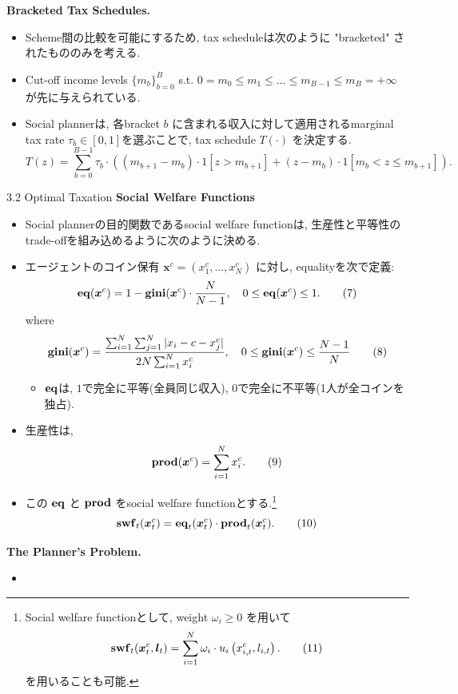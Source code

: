 \documentclass[unicode,aspectratio=169,11pt]{beamer}
\begin{document}
\begin{frame}{}{}
{\bf Bracketed Tax Schedules.}
\begin{itemize}
    \item Scheme間の比較を可能にするため, tax scheduleは次のように "bracketed" されたもののみを考える.
    \item Cut-off income levels $\{m_b\}_{b = 0}^B$ s.t. $0 = m_0 \le m_1 \le \dots \le m_{B-1}\le m_B = +\infty$ が先に与えられている.
    \item Social plannerは, 各bracket $b$ に含まれる収入に対して適用されるmarginal tax rate $\tau_b \in [0,1]$を選ぶことで, tax schedule $T(\cdot)$ を決定する.
    \[ T(z) = \sum_{b = 0}^{B-1} \tau_b \cdot \left((m_{b+1}-m_{b}) \cdot 1[z > m_{b+1}] + (z - m_b)\cdot 1[m_b < z \le m_{b+1}]\right).\]
\end{itemize}
\end{frame}

\begin{frame}{3.2 Optimal Taxation}{}
{\bf Social Welfare Functions}
\begin{itemize}
    \item Social plannerの目的関数であるsocial welfare functionは, 生産性と平等性のtrade-offを組み込めるように次のように決める.
    \item エージェントのコイン保有 $\bm{x}^c = (x_1^c, \dots, x_N^c)$ に対し, equalityを次で定義:
    \[ {\bf{eq}}(\bm{x}^c) = 1 - {\bf{gini}}(\bm{x}^c)\cdot \frac{N}{N-1},\ \ \ 0 \le {\bf eq}(\bm{x}^c)\le 1.\tag{7} \]
    where
    \[ {\bf{gini}}(\bm{x}^c) = \frac{\sum_{i=1}^N\sum_{j=1}^N |x_{i}-c - x_{j}^c|}{2N \sum_{i=1}^N x_{i}^c},
    \ \ \ 0 \le {\bf gini}(\bm{x}^c) \le \frac{N-1}{N}\tag{8} \]
    \begin{itemize}
        \item ${\bf eq}$は, $1$で完全に平等(全員同じ収入), $0$で完全に不平等(1人が全コインを独占).
    \end{itemize}
\end{itemize}
\end{frame}

\begin{frame}{}{}
    \begin{itemize}
        \item 生産性は, 
        \[ {\bf prod}(\bm{x}^c) = \sum_{i=1}^N x_{i}^c. \tag{9} \]
        \item この ${\bf eq}$ と ${\bf prod}$ をsocial welfare functionとする.\footnote{Social welfare functionとして, weight $\omega_i \ge 0$ を用いて
        \[ {\bf swf}_t(\bm{x}_t^c, \bm{l}_t) = \sum_{i = 1}^N \omega_i \cdot u_i\left(x_{i,t}^c, l_{i,t}\right). \tag{11}\]
        を用いることも可能.}
        \[ {\bf swf}_t(\bm{x}_t^c) = {\bf eq}_t(\bm{x}_t^c) \cdot {\bf prod}_t (\bm{x}_t^c). \tag{10}\]
    \end{itemize}
\end{frame}

\begin{frame}{}{}
{\bf The Planner's Problem.}
\begin{itemize}
    \item 
\end{itemize}
\end{frame}
\end{document}
